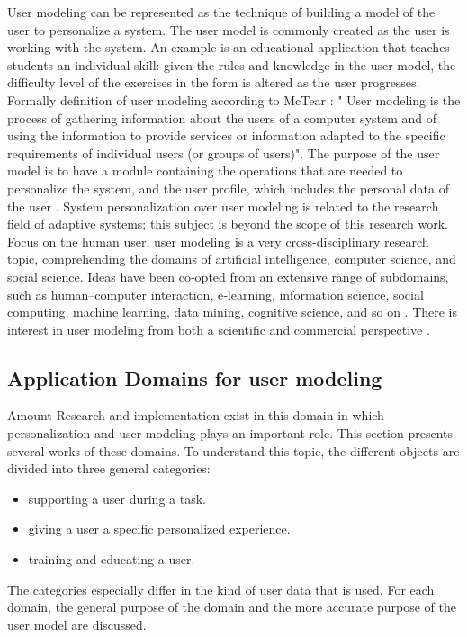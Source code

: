 User modeling can be represented as the technique of building a model of the
user to personalize a system. The user model is commonly created as the user is
working with the system. An example is an educational application that teaches
students an individual skill: given the rules and knowledge in the user model,
the difficulty level of the exercises in the form is altered as the user
progresses.   Formally definition of user modeling according to McTear
\cite{mctear1993user} : " User modeling is the process of gathering information
about the users of a computer system and of using the information to provide
services or information adapted to the specific requirements of individual users
(or groups of users)". The purpose of the user model is to have a module
containing the operations that are needed to personalize the system, and the
user profile, which includes the personal data of the user
\cite{fischer2001user}. System personalization over user modeling is related
to the research field of adaptive systems; this subject is beyond the scope of
this research work. Focus on the human user, user modeling is a very
cross-disciplinary research topic, comprehending the domains of artificial
intelligence, computer science, and social science. Ideas have been co‐opted
from an extensive range of subdomains, such as human–computer interaction,
e‐learning, information science, social computing, machine learning, data
mining, cognitive science, and so on \cite{kay2012coming}
\cite{kobsa2001generic}. There is interest in user modeling from both a
scientific and commercial perspective \cite{razmerita2009user}.
\subsection{Application Domains for user modeling}

Amount Research and implementation exist in this domain in which personalization
and user modeling plays an important role. This section presents several works
of these domains. To understand this topic, the different objects are divided
into three general categories:
\begin{itemize}
	\item {supporting a user during a task. }
	\item {giving a user a specific personalized experience. }
	\item {training and educating a user.}
\end{itemize}
The categories especially differ in the kind of user data that is used. For each
domain, the general purpose of the domain and the more accurate purpose of the
user model are discussed.

